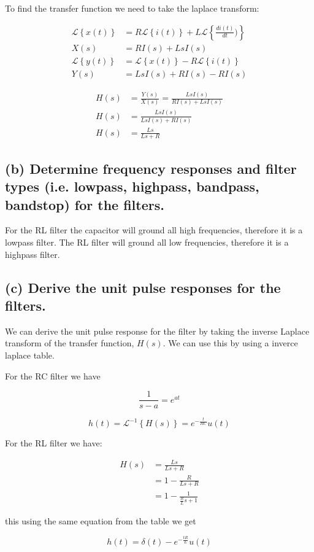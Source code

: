 To find the transfer function we need to take the laplace transform:

\begin{align*}
    \mathcal{L}\left\{ x(t)\right\} &= R\mathcal{L}\left\{i(t)\right\}+L\mathcal{L}\left\{ \frac{di(t)}{dt})\right\} \\
    X(s) &= RI(s)+ LsI(s)\\
    \mathcal{L}\left\{ y(t)\right\} &= \mathcal{L}\left\{x(t)\right\}-R\mathcal{L}\left\{i(t)\right\} \\
    Y(s) &= LsI(s)+RI(s)-RI(s) 
\end{align*}

\begin{align*}
    H(s)&=\frac{Y(s)}{X(s)}=\frac{LsI(s)}{RI(s)+ LsI(s)}\\
    H(s)&=\frac{LsI(s)}{L  s I(s) + RI(s)}\\
    H(s)&=\frac{Ls}{L s + R}
\end{align*}

\subsection*{(b) Determine frequency responses and filter types (i.e. lowpass, highpass, bandpass, bandstop) for the filters.}

For the RL filter the capacitor will ground all high frequencies, therefore it is a lowpass filter. The RL filter will ground all low frequencies, therefore it is a highpass filter.

\subsection*{(c) Derive the unit pulse responses for the filters.}
We can derive the unit pulse response for the filter by taking the inverse Laplace transform of the transfer function, $H(s)$. We can use this by using a inverce laplace table.

For the RC filter we have

\begin{equation*}
    \frac{1}{s-a}=e^{at}
\end{equation*}

\begin{equation*}
    h(t)=\mathcal{L}^{-1}\left\{ H(s)\right\} =e^{-\frac{t}{RC}}u(t)
\end{equation*}

For the RL filter we have:

\begin{align*}
    H(s)&=\frac{Ls}{L s + R}\\
    &=1-\frac{R}{L s + R}\\
    &=1-\frac{1}{\frac{R}{L} s+1}
\end{align*}

this using the same equation from the table we get

\begin{equation*}
    h(t)=\delta(t)- e^{-\frac{tR}{L}}u(t)
\end{equation*}